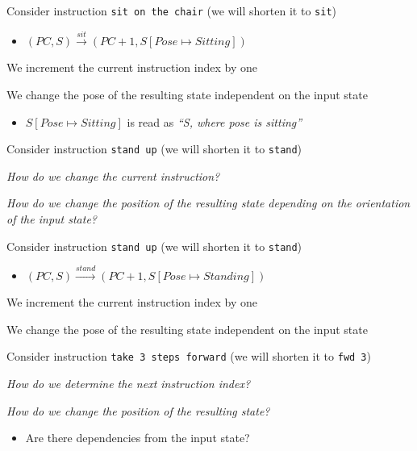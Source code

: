 \documentclass{beamer}
\begin{document}
\begin{slide}{
\item Consider instruction \texttt{sit on the chair} (we will shorten it to \texttt{sit})
\begin{itemize}
\small
\item $(PC,S) \overset{sit}{\rightarrow} (PC+1,S[Pose \mapsto Sitting])$
\end{itemize}
\item We increment the current instruction index by one
\item We change the pose of the resulting state independent on the input state
\begin{itemize}
\item $S[Pose \mapsto Sitting]$ is read as \textit{``S, where pose is sitting''}
\end{itemize}
}\end{slide}

\begin{slide}{
\item Consider instruction \texttt{stand up} (we will shorten it to \texttt{stand})
\item \textit{How do we change the current instruction?}
\item \textit{How do we change the position of the resulting state depending on the orientation of the input state?}
}\end{slide}

\begin{slide}{
\item Consider instruction \texttt{stand up} (we will shorten it to \texttt{stand})
\begin{itemize}
\small
\pause
\item $(PC,S) \overset{stand}{\rightarrow} (PC+1,S[Pose \mapsto Standing])$
\end{itemize}
\item We increment the current instruction index by one
\item We change the pose of the resulting state independent on the input state
}\end{slide}

\begin{slide}{
\item Consider instruction \texttt{take 3 steps forward} (we will shorten it to \texttt{fwd 3})
\item \textit{How do we determine the next instruction index?}
\item \textit{How do we change the position of the resulting state?}
\begin{itemize}
\item Are there dependencies from the input state?
\end{itemize}
}\end{slide}
\end{document}
